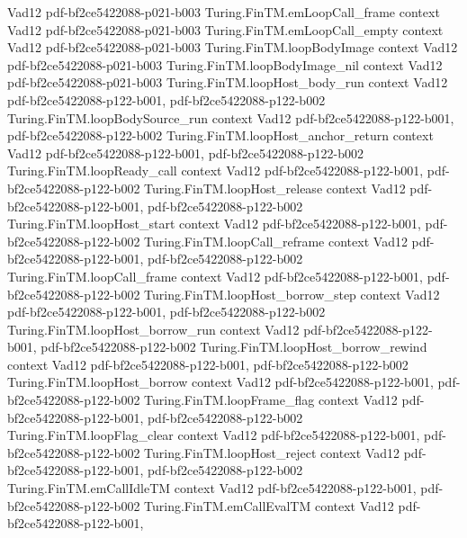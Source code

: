\begin{theorem}
  {Vad12}
  {pdf-bf2ce5422088-p021-b003}
\proofstep
  {Turing.FinTM.emLoopCall_frame}
  {context}
  {Vad12}
  {pdf-bf2ce5422088-p021-b003}
\proofstep
  {Turing.FinTM.emLoopCall_empty}
  {context}
  {Vad12}
  {pdf-bf2ce5422088-p021-b003}
\proofstep
  {Turing.FinTM.loopBodyImage}
  {context}
  {Vad12}
  {pdf-bf2ce5422088-p021-b003}
\proofstep
  {Turing.FinTM.loopBodyImage_nil}
  {context}
  {Vad12}
  {pdf-bf2ce5422088-p021-b003}
\proofstep
  {Turing.FinTM.loopHost_body_run}
  {context}
  {Vad12}
  {pdf-bf2ce5422088-p122-b001,
    pdf-bf2ce5422088-p122-b002}
\proofstep
  {Turing.FinTM.loopBodySource_run}
  {context}
  {Vad12}
  {pdf-bf2ce5422088-p122-b001,
    pdf-bf2ce5422088-p122-b002}
\proofstep
  {Turing.FinTM.loopHost_anchor_return}
  {context}
  {Vad12}
  {pdf-bf2ce5422088-p122-b001,
    pdf-bf2ce5422088-p122-b002}
\proofstep
  {Turing.FinTM.loopReady_call}
  {context}
  {Vad12}
  {pdf-bf2ce5422088-p122-b001,
    pdf-bf2ce5422088-p122-b002}
\proofstep
  {Turing.FinTM.loopHost_release}
  {context}
  {Vad12}
  {pdf-bf2ce5422088-p122-b001,
    pdf-bf2ce5422088-p122-b002}
\proofstep
  {Turing.FinTM.loopHost_start}
  {context}
  {Vad12}
  {pdf-bf2ce5422088-p122-b001,
    pdf-bf2ce5422088-p122-b002}
\proofstep
  {Turing.FinTM.loopCall_reframe}
  {context}
  {Vad12}
  {pdf-bf2ce5422088-p122-b001,
    pdf-bf2ce5422088-p122-b002}
\proofstep
  {Turing.FinTM.loopCall_frame}
  {context}
  {Vad12}
  {pdf-bf2ce5422088-p122-b001,
    pdf-bf2ce5422088-p122-b002}
\proofstep
  {Turing.FinTM.loopHost_borrow_step}
  {context}
  {Vad12}
  {pdf-bf2ce5422088-p122-b001,
    pdf-bf2ce5422088-p122-b002}
\proofstep
  {Turing.FinTM.loopHost_borrow_run}
  {context}
  {Vad12}
  {pdf-bf2ce5422088-p122-b001,
    pdf-bf2ce5422088-p122-b002}
\proofstep
  {Turing.FinTM.loopHost_borrow_rewind}
  {context}
  {Vad12}
  {pdf-bf2ce5422088-p122-b001,
    pdf-bf2ce5422088-p122-b002}
\proofstep
  {Turing.FinTM.loopHost_borrow}
  {context}
  {Vad12}
  {pdf-bf2ce5422088-p122-b001,
    pdf-bf2ce5422088-p122-b002}
\proofstep
  {Turing.FinTM.loopFrame_flag}
  {context}
  {Vad12}
  {pdf-bf2ce5422088-p122-b001,
    pdf-bf2ce5422088-p122-b002}
\proofstep
  {Turing.FinTM.loopFlag_clear}
  {context}
  {Vad12}
  {pdf-bf2ce5422088-p122-b001,
    pdf-bf2ce5422088-p122-b002}
\proofstep
  {Turing.FinTM.loopHost_reject}
  {context}
  {Vad12}
  {pdf-bf2ce5422088-p122-b001,
    pdf-bf2ce5422088-p122-b002}
\proofstep
  {Turing.FinTM.emCallIdleTM}
  {context}
  {Vad12}
  {pdf-bf2ce5422088-p122-b001,
    pdf-bf2ce5422088-p122-b002}
\proofstep
  {Turing.FinTM.emCallEvalTM}
  {context}
  {Vad12}
  {pdf-bf2ce5422088-p122-b001,
}
\end{theorem}
